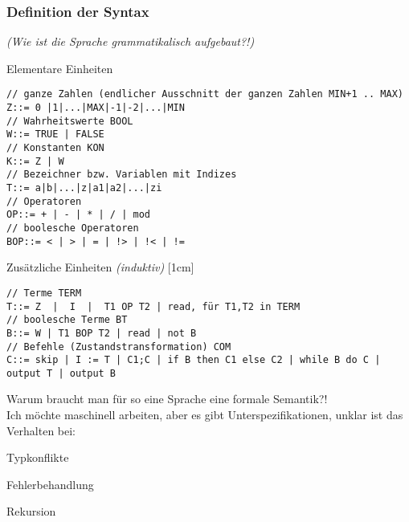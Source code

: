 \subsubsection{Definition der Syntax}
\emph{(Wie ist die Sprache grammatikalisch aufgebaut?!)}
\begin{compactitem}
	\item [Elementare Einheiten] \emph{}
	\begin{lstlisting}
// ganze Zahlen (endlicher Ausschnitt der ganzen Zahlen MIN+1 .. MAX)
Z::= 0 |1|...|MAX|-1|-2|...|MIN 
// Wahrheitswerte BOOL
W::= TRUE | FALSE
// Konstanten KON
K::= Z | W
// Bezeichner bzw. Variablen mit Indizes
T::= a|b|...|z|a1|a2|...|zi
// Operatoren
OP::= + | - | * | / | mod
// boolesche Operatoren
BOP::= < | > | = | !> | !< | !=
	\end{lstlisting}
	\item [Zusätzliche Einheiten] \emph{(induktiv)}
	[1cm]
	\begin{lstlisting}
// Terme TERM
T::= Z  |  I  |  T1 OP T2 | read, für T1,T2 in TERM
// boolesche Terme BT
B::= W | T1 BOP T2 | read | not B
// Befehle (Zustandstransformation) COM
C::= skip | I := T | C1;C | if B then C1 else C2 | while B do C |  output T | output B
	\end{lstlisting}
\end{compactitem}
Warum braucht man für so eine Sprache eine formale Semantik?!\\
Ich möchte maschinell arbeiten, aber es gibt Unterspezifikationen, unklar ist das Verhalten bei:
\begin{compactitem}
\item Typkonflikte
\item Fehlerbehandlung
\item Rekursion
\end{compactitem}

